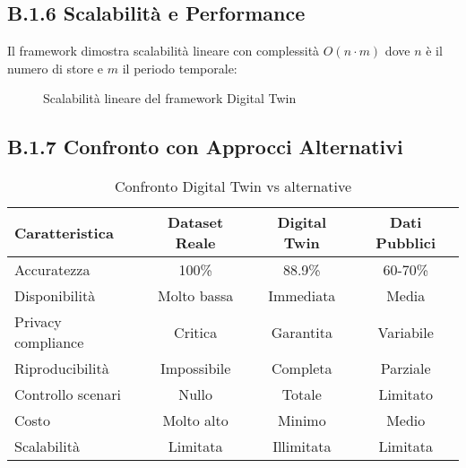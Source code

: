 \subsection{\texorpdfstring{\textbf{B.1.6 Scalabilità e Performance}}{B.1.6 - Scalabilità e Performance}}

Il framework dimostra scalabilità lineare con complessità $O(n \cdot m)$ dove $n$ è il numero di store e $m$ il periodo temporale:

\begin{figure}[h]
\centering
{}
\caption{Scalabilità lineare del framework Digital Twin}
\label{fig:scalability}
\end{figure}

\subsection{\texorpdfstring{\textbf{B.1.7 Confronto con Approcci Alternativi}}{B.1.7 - Confronto con Approcci Alternativi}}

\begin{table}[h]
\centering
\caption{Confronto Digital Twin vs alternative}
\label{tab:comparison}
\begin{tabular}{@{}lccc@{}}
\toprule
\textbf{Caratteristica} & \textbf{Dataset Reale} & \textbf{Digital Twin} & \textbf{Dati Pubblici} \\
\midrule
Accuratezza & 100\% & 88.9\% & 60-70\% \\
Disponibilità & Molto bassa & Immediata & Media \\
Privacy compliance & Critica & Garantita & Variabile \\
Riproducibilità & Impossibile & Completa & Parziale \\
Controllo scenari & Nullo & Totale & Limitato \\
Costo & Molto alto & Minimo & Medio \\
Scalabilità & Limitata & Illimitata & Limitata \\
\bottomrule
\end{tabular}
\end{table}

